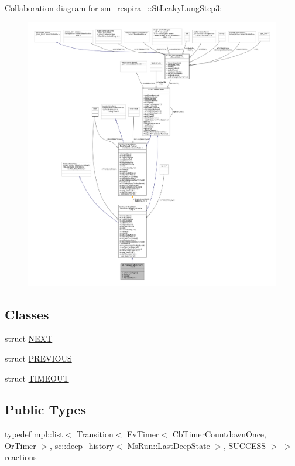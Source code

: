 Collaboration diagram for sm\+\_\+respira\+\_\+:\+:St\+Leaky\+Lung\+Step3\+:
\nopagebreak
\begin{figure}[H]
\begin{center}
\leavevmode
\includegraphics[width=350pt]{structsm__respira__1_1_1StLeakyLungStep3__coll__graph}
\end{center}
\end{figure}
\subsection*{Classes}
\begin{DoxyCompactItemize}
\item 
struct \hyperlink{structsm__respira__1_1_1StLeakyLungStep3_1_1NEXT}{N\+E\+XT}
\item 
struct \hyperlink{structsm__respira__1_1_1StLeakyLungStep3_1_1PREVIOUS}{P\+R\+E\+V\+I\+O\+US}
\item 
struct \hyperlink{structsm__respira__1_1_1StLeakyLungStep3_1_1TIMEOUT}{T\+I\+M\+E\+O\+UT}
\end{DoxyCompactItemize}
\subsection*{Public Types}
\begin{DoxyCompactItemize}
\item 
typedef mpl\+::list$<$ Transition$<$ Ev\+Timer$<$ Cb\+Timer\+Countdown\+Once, \hyperlink{classsm__respira__1_1_1OrTimer}{Or\+Timer} $>$, sc\+::deep\+\_\+history$<$ \hyperlink{classsmacc_1_1SmaccState_a60088405d2d99d468caa0baa3b2830a8}{Ms\+Run\+::\+Last\+Deep\+State} $>$, \hyperlink{classSUCCESS}{S\+U\+C\+C\+E\+SS} $>$ $>$ \hyperlink{structsm__respira__1_1_1StLeakyLungStep3_a6a3e225a1e266d477eb4821fcf9d0658}{reactions}
\end{DoxyCompactItemize}
